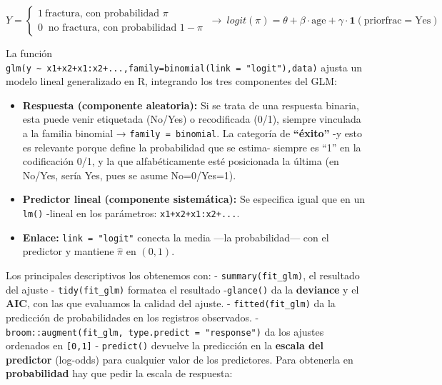 \documentclass[
  letterpaper,
  DIV=11,
  numbers=noendperiod]{scrartcl}
\providecommand{\tightlist}{%
  \setlength{\itemsep}{0pt}\setlength{\parskip}{0pt}}\usepackage{longtable,booktabs,array}
\begin{document}
\[Y=\begin{cases} 1 \ \text{fractura, con probabilidad } \pi \\
0 \ \text{ no fractura, con probabilidad } 1-\pi
\end{cases} \ \rightarrow \ logit(\pi)=\theta + \beta \cdot \text{age} + \gamma \cdot \mathbf{1}(\text{priorfrac}=\text{Yes})
\]

\begin{tcolorbox}[enhanced jigsaw, coltitle=black, rightrule=.15mm, arc=.35mm, leftrule=.75mm, colback=white, colbacktitle=quarto-callout-tip-color!10!white, left=2mm, breakable, toptitle=1mm, toprule=.15mm, bottomtitle=1mm, titlerule=0mm, title=\textcolor{quarto-callout-tip-color}{\faLightbulb}\hspace{0.5em}{🔧 En R. El \texttt{glm()} con datos binarios}, bottomrule=.15mm, opacityback=0, opacitybacktitle=0.6, colframe=quarto-callout-tip-color-frame]

La función
\texttt{glm(y\ \textasciitilde{}\ x1+x2+x1:x2+...,family=binomial(link\ =\ "logit"),data)}
ajusta un modelo lineal generalizado en R, integrando los tres
componentes del GLM:

\begin{itemize}
\tightlist
\item
  \textbf{Respuesta (componente aleatoria):} Si se trata de una
  respuesta binaria, esta puede venir etiquetada (No/Yes) o recodificada
  (0/1), siempre vinculada a la familia binomial →
  \texttt{family\ =\ binomial}. La categoría de \textbf{``éxito''} -y
  esto es relevante porque define la probabilidad que se estima- siempre
  es ``1'' en la codificación 0/1, y la que alfabéticamente esté
  posicionada la última (en No/Yes, sería Yes, pues se asume
  No=0/Yes=1).
\item
  \textbf{Predictor lineal (componente sistemática):} Se especifica
  igual que en un \texttt{lm()} -lineal en los parámetros:
  \texttt{x1+x2+x1:x2+...}.
\item
  \textbf{Enlace:} \texttt{link\ =\ "logit"} conecta la media ---la
  probabilidad--- con el predictor y mantiene \(\hat\pi\) en \((0,1)\).
\end{itemize}

Los principales descriptivos los obtenemos con: -
\texttt{summary(fit\_glm)}, el resultado del ajuste -
\texttt{tidy(fit\_glm)} formatea el resultado -\texttt{glance()} da la
\textbf{deviance} y el \textbf{AIC}, con las que evaluamos la calidad
del ajuste. - \texttt{fitted(fit\_glm)} da la predicción de
probabilidades en los registros observados. -
\texttt{broom::augment(fit\_glm,\ type.predict\ =\ "response")} da los
ajustes ordenados en \texttt{{[}0,1{]}} - \texttt{predict()} devuelve la
predicción en la \textbf{escala del predictor} (log-odds) para cualquier
valor de los predictores. Para obtenerla en \textbf{probabilidad} hay
que pedir la escala de respuesta:


\end{tcolorbox}
\end{document}
